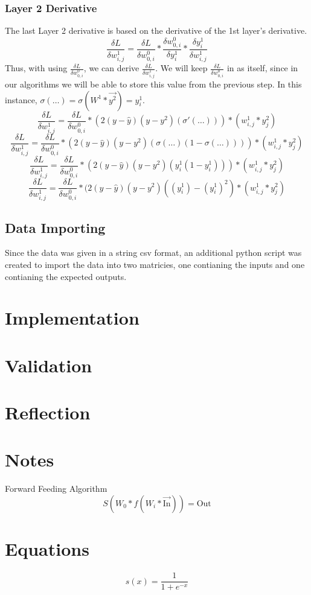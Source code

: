 \documentclass[10pt]{article}
\begin{document}
\subsubsection{Layer 2 Derivative}
The last Layer 2 derivative is based on the derivative of the 1st layer's derivative.
$$\frac{\delta L}{\delta w^1_{i,j}} = \frac{\delta L}{\delta w^0_{0,i}} * \frac{\delta w^0_{0,i}}{\delta y^1_i} * \frac{\delta y^1_i}{\delta w^1_{i,j}}$$
Thus, with using $\frac{\delta L}{\delta w^0_{0,i}}$, we can derive $\frac{\delta L}{\delta w^1_{i,j}}$. We will keep $\frac{\delta L}{\delta w^0_{0,i}}$ in as itself, since in our algorithms we will be able to store this value from the previous step. In this instance, $\sigma(\ldots) = \sigma(W^1 * \vec{y^2}) = y^1_i$.
$$\frac{\delta L}{\delta w^1_{i,j}} = \frac{\delta L}{\delta w^0_{0,i}} * (2(y-\hat{y})(y - y^2)(\sigma'(\ldots))) * (w^1_{i,j} * y^2_{j})$$
$$\frac{\delta L}{\delta w^1_{i,j}} = \frac{\delta L}{\delta w^0_{0,i} }* (2(y - \hat{y})(y - y^2)(\sigma(\ldots)(1 - \sigma(\ldots)))) * (w^1_{i,j} * y^2_{j})$$
$$\frac{\delta L}{\delta w^1_{i,j}} = \frac{\delta L}{\delta w^0_{0,i}} * (2(y - \hat{y})(y - y^2)(y^1_i (1 - y^1_i))) * (w^1_{i,j} * y^2_{j})$$
$$\frac{\delta L}{\delta w^1_{i,j}} = \frac{\delta L}{\delta w^0_{0,i}} * (2(y - \hat{y})(y - y^2)((y^1_i) - (y^1_i)^2) * (w^1_{i,j} * y^2_{j})$$


\subsection{Data Importing}
Since the data was given in a string csv format, an additional python script was created to import the data into two matricies, one contianing the inputs and one contianing the expected outputs.


\section{Implementation}
\section{Validation}
\section{Reflection}

\section{Notes}
Forward Feeding Algorithm
$$S(W_0 * f(W_i * \vec{\text{In}})) = \text{Out}$$

\section{Equations}
$$s(x) = \frac{1}{1 + e^{-x}}$$


\end{document}
